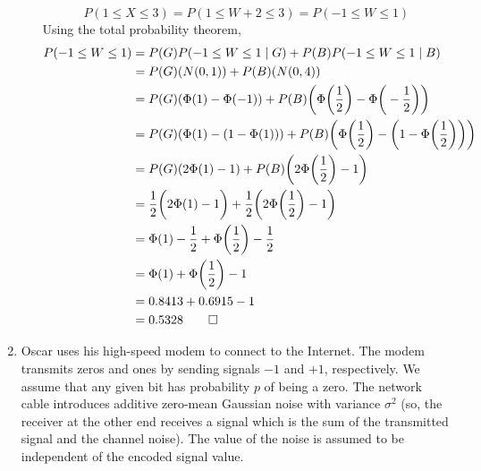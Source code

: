 \documentclass[paper=usletter, fontsize=12pt]{article}
\begin{document}
\begin{enumerate}
\begin{enumerate}
\begin{cproof}
                \begin{equation*}
                    P(1 \le X \le 3) = P(1 \le W + 2 \le 3) = P(-1 \le W \le 1)
                \end{equation*}
                Using the total probability theorem,
                \begin{align*}
                    P(-1 \le W \le 1) &= P(G)P(-1 \le W \le 1 \mid G) + P(B)P(-1 \le W \le 1 \mid B) \\
                    & = P(G)(N(0,1)) + P(B)(N(0,4))\\
                    & = P(G)(\Phi(1)-\Phi(-1)) + P(B)\bigg(\Phi\bigg(\frac{1}{2}\bigg)-\Phi\bigg(-\frac{1}{2}\bigg)\bigg)\\
                    & = P(G)(\Phi(1)-(1-\Phi(1))) + P(B)\bigg(\Phi\bigg(\frac{1}{2}\bigg)-\bigg(1-\Phi\bigg(\frac{1}{2}\bigg)\bigg)\bigg)\\
                    & = P(G)(2\Phi(1)-1) + P(B)\bigg(2\Phi\bigg(\frac{1}{2}\bigg)-1\bigg)\\
                    & = \frac{1}{2}\bigg(2\Phi(1)-1\bigg) + \frac{1}{2}\bigg(2\Phi\bigg(\frac{1}{2}\bigg)-1\bigg)\\
                    & = \Phi(1)-\frac{1}{2} + \Phi\bigg(\frac{1}{2}\bigg)-\frac{1}{2}\\
                    & = \Phi(1) + \Phi\bigg(\frac{1}{2}\bigg)-1\\
                    & = 0.8413 + 0.6915-1\\
                    & = 0.5328 \qedhere
                \end{align*}
                \endgroup

            \end{cproof}

        \end{enumerate}

        \item Oscar uses his high-speed modem to connect to the Internet. The
        modem transmits zeros and ones by sending signals $-1$ and $+1$,
        respectively. We assume that any given bit has probability $p$ of being
        a zero. The network cable introduces additive zero-mean Gaussian noise
        with variance $\sigma^2$ (so, the receiver at the other end receives a
        signal which is the sum of the transmitted signal and the channel
        noise). The value of the noise is assumed to be independent of the
        encoded signal value.
        \begin{enumerate}


\end{enumerate}
\end{enumerate}
\end{document}
